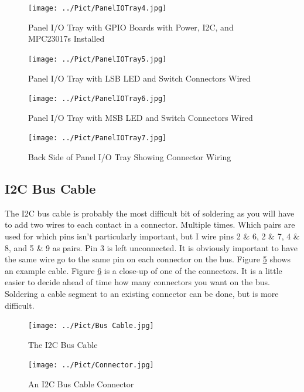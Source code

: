 \documentclass[10pt, openany]{book}
\begin{document}
\begin{figure}[ht!]
  \centering
  \texttt{[image: ../Pict/PanelIOTray4.jpg]}
  \caption{Panel I/O Tray with GPIO Boards with Power, I2C, and MPC23017s Installed}
  \label{fig:PanelIO4}
\end{figure}

\begin{figure}[ht!]
  \centering
  \texttt{[image: ../Pict/PanelIOTray5.jpg]}
  \caption{Panel I/O Tray with LSB LED and Switch Connectors Wired}
  \label{fig:PanelIO5}
\end{figure}

\begin{figure}[ht!]
  \centering
  \texttt{[image: ../Pict/PanelIOTray6.jpg]}
  \caption{Panel I/O Tray with MSB LED and Switch Connectors Wired}
  \label{fig:PanelIO6}
\end{figure}

\begin{figure}[ht!]
  \centering
  \texttt{[image: ../Pict/PanelIOTray7.jpg]}
  \caption{Back Side of Panel I/O Tray Showing Connector Wiring}
  \label{fig:PanelIO7}
\end{figure}

\clearpage
\subsection{I2C Bus Cable}
The I2C bus cable is probably the most difficult bit of soldering as you will have to add two wires to each contact in a connector.  Multiple times.  Which pairs are used for which pins isn't particularly important, but I wire pins 2 \& 6, 2 \& 7, 4 \& 8, and 5 \& 9 as pairs.  Pin 3 is left unconnected.  It is obviously important to have the same wire go to the same pin on each connector on the bus.  Figure \ref{fig:Cable1} shows an example cable.  Figure \ref{fig:Cable2} is a close-up of one of the connectors.  It is a little easier to decide ahead of time how many connectors you want on the bus.  Soldering a cable segment to an existing connector can be done, but is more difficult.

\begin{figure}[ht!]
  \centering
  \texttt{[image: ../Pict/Bus Cable.jpg]}
  \caption{The I2C Bus Cable}
  \label{fig:Cable1}
\end{figure}

\begin{figure}[ht!]
  \centering
  \texttt{[image: ../Pict/Connector.jpg]}
  \caption{An I2C Bus Cable Connector}
  \label{fig:Cable2}
\end{figure}
\end{document}
